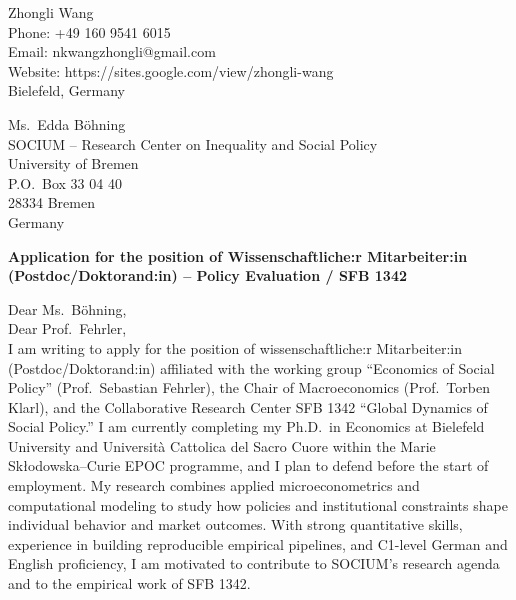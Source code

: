 \documentclass[11pt]{article}
\begin{document}
\noindent
Zhongli Wang \\
Phone: +49 160 9541 6015 \\
Email: nkwangzhongli@gmail.com \\
Website: https://sites.google.com/view/zhongli-wang \\
Bielefeld, Germany \\

\vspace{0.5cm}

\noindent
Ms.\ Edda B\"ohning \\
SOCIUM -- Research Center on Inequality and Social Policy \\
University of Bremen \\
P.O.\ Box 33 04 40 \\
28334 Bremen \\
Germany \\

\vspace{0.5cm}

\noindent
\textbf{Application for the position of Wissenschaftliche:r Mitarbeiter:in (Postdoc/Doktorand:in) -- Policy Evaluation / SFB 1342} \\

\vspace{0.3cm}

\noindent Dear Ms.\ B\"ohning, \\
\noindent 
Dear Prof.\ Fehrler,\\[0.2cm]

I am writing to apply for the position of wissenschaftliche:r Mitarbeiter:in (Postdoc/Doktorand:in) affiliated with the working group ``Economics of Social Policy'' (Prof.\ Sebastian Fehrler), the Chair of Macroeconomics (Prof.\ Torben Klarl), and the Collaborative Research Center SFB 1342 ``Global Dynamics of Social Policy.'' 
I am currently completing my Ph.D.\ in Economics at Bielefeld University and Universit\`a Cattolica del Sacro Cuore within the Marie Sk{\l}odowska--Curie EPOC programme, and I plan to defend before the start of employment. 
My research combines applied microeconometrics and computational modeling to study how policies and institutional constraints shape individual behavior and market outcomes. 
With strong quantitative skills, experience in building reproducible empirical pipelines, and C1-level German and English proficiency, I am motivated to contribute to SOCIUM's research agenda and to the empirical work of SFB 1342.
\end{document}
